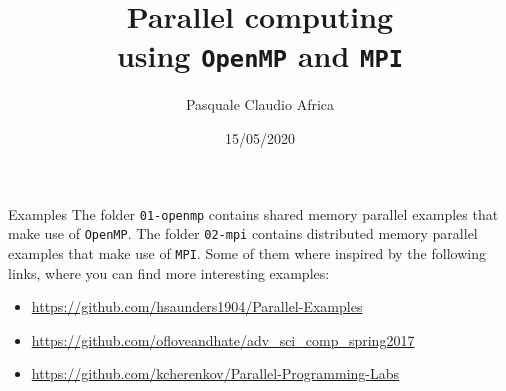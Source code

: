 \documentclass[10pt]{beamer}
\begin{document}
    \title{Parallel computing\protect\\ using \texttt{OpenMP} and \texttt{MPI}}
    \author{Pasquale Claudio Africa}
    \date{15/05/2020}

\begin{frame}
    \maketitle
\end{frame}

\begin{frame}{Examples}
The folder \texttt{01-openmp} contains shared memory parallel examples that make use of \texttt{OpenMP}.
\vfill
The folder \texttt{02-mpi} contains distributed memory parallel examples that make use of \texttt{MPI}.
\vfill
Some of them where inspired by the following links, where you can find more interesting examples:
\begin{itemize}
    \item \url{https://github.com/hsaunders1904/Parallel-Examples}
    \item \url{https://github.com/ofloveandhate/adv_sci_comp_spring2017}
    \item \url{https://github.com/kcherenkov/Parallel-Programming-Labs}
\end{itemize}
\end{frame}
\end{document}
